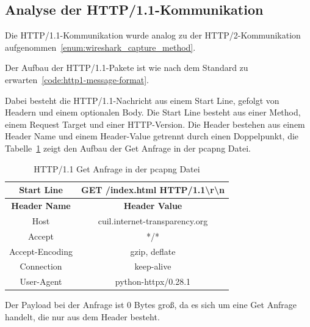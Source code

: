\FloatBarrier{}
\subsection{Analyse der HTTP/1.1-Kommunikation}

Die HTTP/1.1-Kommunikation wurde analog zu der HTTP/2-Kommunikation aufgenommen~\ref{enum:wireshark_capture_method}.

Der Aufbau der HTTP/1.1-Pakete ist wie nach dem Standard zu erwarten~\ref{code:http1-message-format}.


Dabei besteht die HTTP/1.1-Nachricht aus einem Start Line, gefolgt von Headern und einem optionalen Body.
Die Start Line besteht aus einer Method, einem Request Target und einer HTTP-Version.
Die Header bestehen aus einem Header Name und einem Header-Value getrennt durch einen Doppelpunkt, die Tabelle~\ref{tab:http11-header-request} zeigt den Aufbau der Get Anfrage in der pcapng Datei.

\begin{table}[h]
    \centering
    \begin{tabular}{|c|c|}
        \hline
        \textbf{Start Line} & GET /index.html HTTP/1.1\textbackslash{}r\textbackslash{}n \\
        \hline
        \textbf{Header Name} & \textbf{Header Value} \\
        \hline
        Host & cuil.internet-transparency.org \\
        Accept & */* \\
        Accept-Encoding & gzip, deflate \\
        Connection & keep-alive \\
        User-Agent & python-httpx/0.28.1 \\
        \hline
    \end{tabular}
    \caption{HTTP/1.1 Get Anfrage in der pcapng Datei}\label{tab:http11-header-request}
\end{table}

Der Payload bei der Anfrage ist 0 Bytes groß, da es sich um eine Get Anfrage handelt, die nur aus dem Header besteht.


